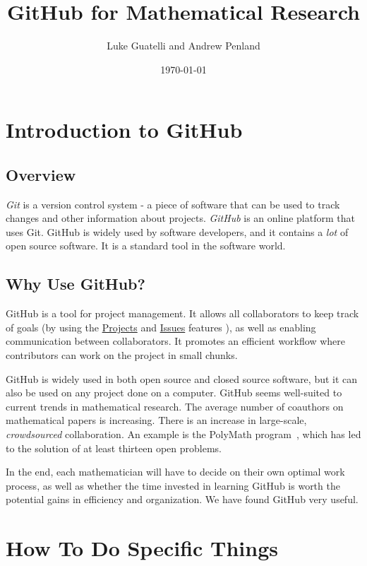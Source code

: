 \documentclass[11pt]{article}
\title{GitHub for Mathematical Research}
\author{Luke Guatelli and Andrew Penland}
\date{\today}
\begin{document}
\maketitle

\section{Introduction to GitHub}

\subsection{Overview}

\textit{Git} is a version control system - a piece of software that can be used to track changes and other information about projects. \textit{GitHub} is an online platform that uses Git. GitHub is widely used by software developers, and it contains a \textit{lot} of open source software. It is a standard tool in the software world. 

\subsection{Why Use GitHub?}

GitHub is a tool for project management. It allows all collaborators to keep track of goals (by using the \hyperlink{proj-section}{Projects} and \hyperlink{issues-section}{Issues} features ), as well as enabling communication between collaborators. It promotes an efficient workflow where contributors can work on the project in small chunks.

GitHub is widely used in both open source and closed source software, but it can also be used on any project done on a computer.  GitHub seems well-suited to current trends in mathematical research. The average number of coauthors on mathematical papers is increasing. There is an increase in large-scale, \textit{crowdsourced} collaboration. An example is the PolyMath program~\cite{polymath-blog}, which has led to the solution of at least thirteen open problems. 

In the end, each mathematician will have to decide on their own optimal work process, as well as whether the time invested in learning GitHub is worth the potential gains in efficiency and organization. We have found GitHub very useful.

\section{How To Do Specific Things}
\newpage
\end{document}
